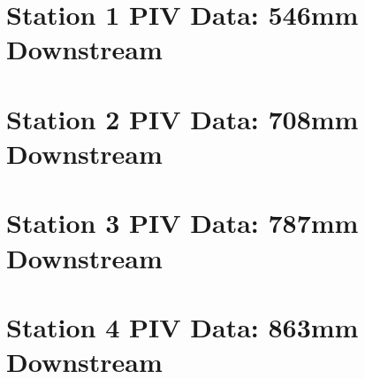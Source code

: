 

\chapter{Station 1 PIV Data: 546mm Downstream}












\chapter{Station 2 PIV Data: 708mm Downstream}












\chapter{Station 3 PIV Data: 787mm Downstream}












\chapter{Station 4 PIV Data: 863mm Downstream}












